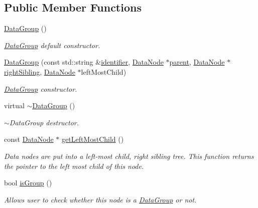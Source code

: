 \subsection*{Public Member Functions}
\begin{DoxyCompactItemize}
\item 
\hyperlink{classDatabase_1_1DataGroup_a633bd46aaee7adafcb0181b12c2466f0}{Data\+Group} ()\hypertarget{classDatabase_1_1DataGroup_a633bd46aaee7adafcb0181b12c2466f0}{}\label{classDatabase_1_1DataGroup_a633bd46aaee7adafcb0181b12c2466f0}

\begin{DoxyCompactList}\small\item\em \hyperlink{classDatabase_1_1DataGroup}{Data\+Group} default constructor. \end{DoxyCompactList}\item 
\hyperlink{classDatabase_1_1DataGroup_a1bed40d80c81f52145c4696b7c70d75b}{Data\+Group} (const std\+::string \&\hyperlink{classDatabase_1_1DataNode_ace59a7fba9c490d2dae59c4af7b0c71f}{identifier}, \hyperlink{classDatabase_1_1DataNode}{Data\+Node} $\ast$\hyperlink{classDatabase_1_1DataNode_a8d70472d0f14aa3ae3ee74d9f3e879d6}{parent}, \hyperlink{classDatabase_1_1DataNode}{Data\+Node} $\ast$\hyperlink{classDatabase_1_1DataNode_ae335fc33c3813e8a6638d50faef44d5d}{right\+Sibling}, \hyperlink{classDatabase_1_1DataNode}{Data\+Node} $\ast$left\+Most\+Child)
\begin{DoxyCompactList}\small\item\em \hyperlink{classDatabase_1_1DataGroup}{Data\+Group} constructor. \end{DoxyCompactList}\item 
virtual \hyperlink{classDatabase_1_1DataGroup_a88b36fe397284004ce86726e7808466e}{$\sim$\+Data\+Group} ()\hypertarget{classDatabase_1_1DataGroup_a88b36fe397284004ce86726e7808466e}{}\label{classDatabase_1_1DataGroup_a88b36fe397284004ce86726e7808466e}

\begin{DoxyCompactList}\small\item\em $\sim$\+Data\+Group destructor. \end{DoxyCompactList}\item 
const \hyperlink{classDatabase_1_1DataNode}{Data\+Node} $\ast$ \hyperlink{classDatabase_1_1DataGroup_af6abab9878250ade850fc8e43042ab01}{get\+Left\+Most\+Child} ()
\begin{DoxyCompactList}\small\item\em Data nodes are put into a left-\/most child, right sibling tree. This function returns the pointer to the left most child of this node. \end{DoxyCompactList}\item 
bool \hyperlink{classDatabase_1_1DataGroup_a89bb1aa667805f278ad0dfa9172c3ee0}{is\+Group} ()
\begin{DoxyCompactList}\small\item\em Allows user to check whether this node is a \hyperlink{classDatabase_1_1DataGroup}{Data\+Group} or not. \end{DoxyCompactList}\end{DoxyCompactItemize}
